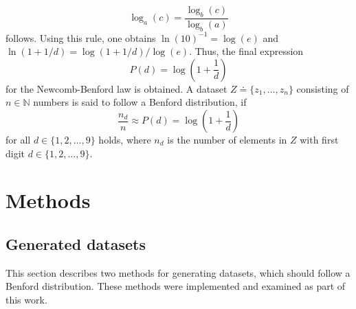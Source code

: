 \documentclass[a4paper,10pt, twocolumn]{article}
\begin{document}
\begin{equation}
\log_a(c) = \frac{\log_b(c)}{\log_b(a)}
\end{equation} follows. Using this rule, one obtains $\ln(10)^{-1} = \log(e)$ and $\ln(1+1/d) = \log(1+1/d)/\log(e)$. Thus, the final expression \begin{equation}
P(d) = \log\left(1 + \frac{1}{d}\right)
\end{equation} for the Newcomb-Benford law is obtained. A dataset $Z \doteq \{z_1,\dots,z_n\}$ consisting of $n \in \mathbb{N}$ numbers is said to follow a Benford distribution, if \begin{equation}
\frac{n_{d}}{n} \approx P(d) = \log\left(1+\frac{1}{d}\right)
\end{equation} for all $d \in \{1,2,\dots,9\}$ holds, where $n_{d}$ is the number of elements in $Z$ with first digit $d \in \{1,2,\dots,9\}$.


\section{Methods}
\subsection{Generated datasets}
This section describes two methods for generating datasets, which should follow a Benford distribution. These methods were implemented and examined as part of this work.

\end{document}
